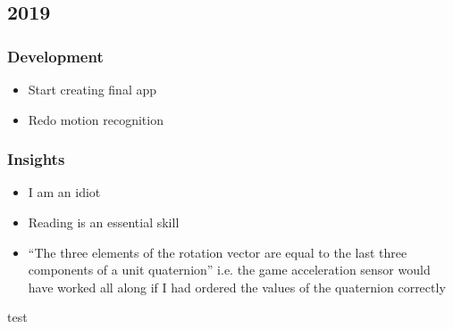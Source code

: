 \documentclass{article}
\begin{document}
    \subsection{2019}
    \subsubsection{Development}
    \begin{itemize}
    \item Start creating final app
      \item Redo motion recognition
      \end{itemize}
      \subsubsection{Insights}
      \begin{itemize}
      \item I am an idiot
      \item Reading is an essential skill
      \item ``The three elements of the rotation vector are equal to the last three components of a unit quaternion'' i.e. the game acceleration sensor would have worked all along if I had ordered the values of the quaternion correctly
      \end{itemize}
      test
\end{document}
